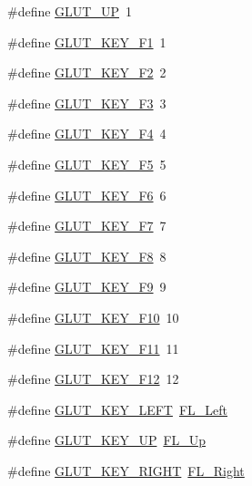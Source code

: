 \begin{DoxyCompactItemize}
\item 
\#define \hyperlink{glut_8_h_a1afddf27f2001b4e65470a41bdde30d9}{G\+L\+U\+T\+\_\+\+UP}~1
\item 
\#define \hyperlink{glut_8_h_af63cc7b29a12af0955c42dea87829736}{G\+L\+U\+T\+\_\+\+K\+E\+Y\+\_\+\+F1}~1
\item 
\#define \hyperlink{glut_8_h_acb72407f62b6cfc4faac1b9d79da2623}{G\+L\+U\+T\+\_\+\+K\+E\+Y\+\_\+\+F2}~2
\item 
\#define \hyperlink{glut_8_h_a9680619e50bb1ec577e2e36be50c8b90}{G\+L\+U\+T\+\_\+\+K\+E\+Y\+\_\+\+F3}~3
\item 
\#define \hyperlink{glut_8_h_ae8d810517559c68a5f62456d2b77425a}{G\+L\+U\+T\+\_\+\+K\+E\+Y\+\_\+\+F4}~4
\item 
\#define \hyperlink{glut_8_h_a996d079f4f3f3a8c7c6a01ca6db9258b}{G\+L\+U\+T\+\_\+\+K\+E\+Y\+\_\+\+F5}~5
\item 
\#define \hyperlink{glut_8_h_a14ff110c3b644cf9072d37197fa0a34e}{G\+L\+U\+T\+\_\+\+K\+E\+Y\+\_\+\+F6}~6
\item 
\#define \hyperlink{glut_8_h_a0cb22cbc1ac854e2c8a1a5f6ae04665c}{G\+L\+U\+T\+\_\+\+K\+E\+Y\+\_\+\+F7}~7
\item 
\#define \hyperlink{glut_8_h_aac707cfc5f4e56de1ea98466be5ea5ad}{G\+L\+U\+T\+\_\+\+K\+E\+Y\+\_\+\+F8}~8
\item 
\#define \hyperlink{glut_8_h_aadc9265d666b1bc3827ba25570f18cf4}{G\+L\+U\+T\+\_\+\+K\+E\+Y\+\_\+\+F9}~9
\item 
\#define \hyperlink{glut_8_h_aa0945fa7982b39eefa42014700f483c9}{G\+L\+U\+T\+\_\+\+K\+E\+Y\+\_\+\+F10}~10
\item 
\#define \hyperlink{glut_8_h_a9ff68b79b29283e2602c936b5c3aefc5}{G\+L\+U\+T\+\_\+\+K\+E\+Y\+\_\+\+F11}~11
\item 
\#define \hyperlink{glut_8_h_a29817688a1c9f26fd697d811da48e223}{G\+L\+U\+T\+\_\+\+K\+E\+Y\+\_\+\+F12}~12
\item 
\#define \hyperlink{glut_8_h_abb193c04e62c29184751e2055fda89f5}{G\+L\+U\+T\+\_\+\+K\+E\+Y\+\_\+\+L\+E\+FT}~\hyperlink{_enumerations_8_h_afe89caa1c5019809095a6129156f7c5a}{F\+L\+\_\+\+Left}
\item 
\#define \hyperlink{glut_8_h_ada7f412e1ab4f271da990a217aca5b73}{G\+L\+U\+T\+\_\+\+K\+E\+Y\+\_\+\+UP}~\hyperlink{_enumerations_8_h_a050700391ba0940ca16b0e5dbf4644f0}{F\+L\+\_\+\+Up}
\item 
\#define \hyperlink{glut_8_h_a19beda7d173600127ee540aee53dd081}{G\+L\+U\+T\+\_\+\+K\+E\+Y\+\_\+\+R\+I\+G\+HT}~\hyperlink{_enumerations_8_h_a45679ed656e6b248319719719e894f13}{F\+L\+\_\+\+Right}

\end{DoxyCompactItemize}
